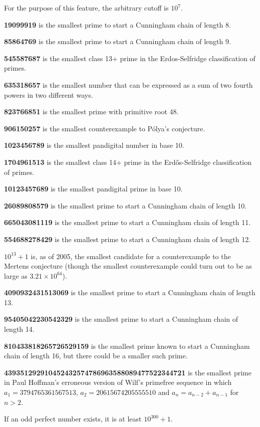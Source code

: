 \documentclass[12pt]{article}
\begin{document}

For the purpose of this feature, the arbitrary cutoff is $10^7$.

{\bf 19099919} is the smallest prime to start a Cunningham chain of length 8.

{\bf 85864769} is the smallest prime to start a Cunningham chain of length 9.

{\bf 545587687} is the smallest class 13+ prime in the Erdos-Selfridge classification of primes.

{\bf 635318657} is the smallest number that can be expressed as a sum of two fourth powers in two different ways.

{\bf 823766851} is the smallest prime with primitive root 48.

{\bf 906150257} is the smallest counterexample to P\'olya's conjecture.

{\bf 1023456789} is the smallest pandigital number in base 10.

{\bf 1704961513} is the smallest class 14+ prime in the Erd\H{o}s-Selfridge classification of primes.

{\bf 10123457689} is the smallest pandigital prime in base 10.

{\bf 26089808579} is the smallest prime to start a Cunningham chain of length 10.  

{\bf 665043081119} is the smallest prime to start a Cunningham chain of length 11.

{\bf 554688278429} is the smallest prime to start a Cunningham chain of length 12.

$10^{13} + 1$ is, as of 2005, the smallest candidate for a counterexample to the Mertens conjecture (though the smallest counterexample could turn out to be as large as $3.21 \times 10^{64}$).

{\bf 4090932431513069} is the smallest prime to start a Cunningham chain of length 13.

{\bf 95405042230542329} is the smallest prime to start a Cunningham chain of length 14.

{\bf 810433818265726529159} is the smallest prime known to start a Cunningham chain of length 16, but there could be a smaller such prime.

{\bf 439351292910452432574786963588089477522344721} is the smallest prime in Paul Hoffman's erroneous version of Wilf's primefree sequence in which $a_1 = 3794765361567513$, $a_2 = 20615674205555510$ and $a_n = a_{n - 2} + a_{n - 1}$ for $n > 2$.

If an odd perfect number exists, it is at least $10^{300} + 1$.
\end{document}
